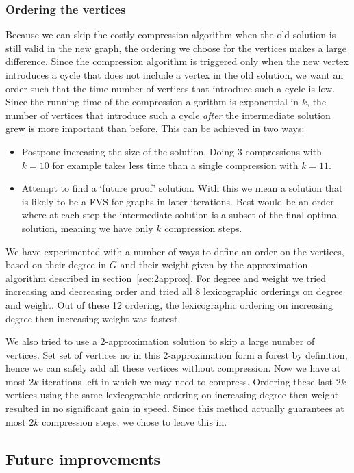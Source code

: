 \subsubsection{Ordering the vertices}
Because we can skip the costly compression algorithm when the old solution is
still valid in the new graph, the ordering we choose for the vertices makes a large difference. Since the compression
algorithm is triggered only when the new vertex introduces a cycle that does not include a vertex in the old solution,
we want an order such that the time number of vertices that introduce such a cycle is low. Since the running time of the
compression algorithm is exponential in $k$, the number of vertices that introduce such a cycle \emph{after} the
intermediate solution grew is more important than before. This can be achieved in two ways:
\begin{itemize}
	\item Postpone increasing the size of the solution. Doing $3$ compressions with $k=10$ for example takes less time than a
single compression with $k=11$.
	\item Attempt to find a `future proof' solution. With this we mean a solution that is
likely to be a FVS for graphs in later iterations. Best would be an order where at each step the intermediate solution
is a subset of the final optimal solution, meaning we have only $k$ compression steps. 
\end{itemize}
We have
experimented with a number of ways to define an order on the vertices, based on their degree in $G$ and their weight
given by the approximation algorithm described in section~\ref{sec:2approx}. For degree and weight we tried increasing and decreasing order and tried
all 8 lexicographic orderings on degree and weight. Out of these 12 ordering, the lexicographic ordering on increasing
degree then increasing weight was fastest.

We also tried to use a 2-approximation solution to skip a large number of vertices. Set set of vertices no in this
2-approximation form a forest by definition, hence we can safely add all these vertices without compression. Now we have
at most $2k$ iterations left in which we may need to compress. Ordering these last $2k$ vertices using the same
lexicographic ordering on increasing degree then weight resulted in no significant gain in speed. Since this method
actually guarantees at most $2k$ compression steps, we chose to leave this in.

\subsection{Future improvements}
